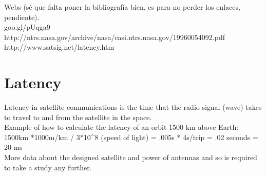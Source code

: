 \documentclass[12pt,a4paper]{report}
\begin{document}
Webs (sé que falta poner la bibliografía bien, es para no perder los enlaces, pendiente). \\
goo.gl/pUqga9 \\
http://ntrs.nasa.gov/archive/nasa/casi.ntrs.nasa.gov/19960054092.pdf \\
http://www.satsig.net/latency.htm \\


\section{Latency}
Latency in satellite communications is the time that the radio signal (wave) takes to travel to and from the satellite in the space. \\
Example of how to calculate the latency of an orbit 1500 km above Earth:\\
1500km *1000m/km / 3*10^8 (speed of light) = .005s * 4s/trip = .02 seconds = 20 ms \\

More data about the designed satellite and power of antennas and so is required to take a study any further. \\


\end{document}
